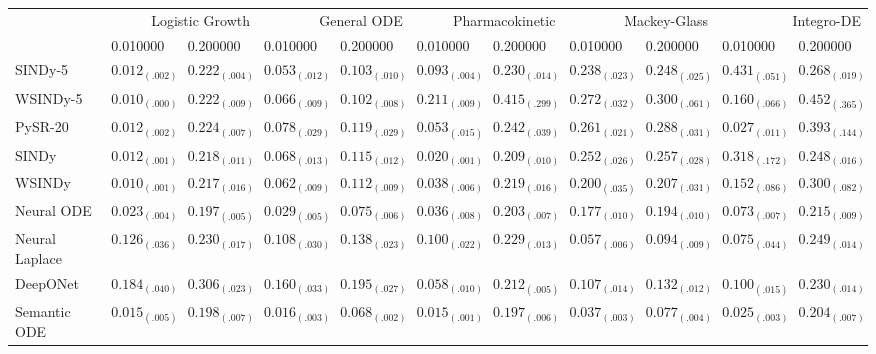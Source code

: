 \begin{tabular}{lllllllllll}
\toprule
 & \multicolumn{2}{r}{Logistic Growth} & \multicolumn{2}{r}{General ODE} & \multicolumn{2}{r}{Pharmacokinetic} & \multicolumn{2}{r}{Mackey-Glass} & \multicolumn{2}{r}{Integro-DE} \\
 & 0.010000 & 0.200000 & 0.010000 & 0.200000 & 0.010000 & 0.200000 & 0.010000 & 0.200000 & 0.010000 & 0.200000 \\
\midrule
SINDy-5 & $0.012_{(.002)}$ & $0.222_{(.004)}$ & $0.053_{(.012)}$ & $0.103_{(.010)}$ & $0.093_{(.004)}$ & $0.230_{(.014)}$ & $0.238_{(.023)}$ & $0.248_{(.025)}$ & $0.431_{(.051)}$ & $0.268_{(.019)}$ \\
WSINDy-5 & $0.010_{(.000)}$ & $0.222_{(.009)}$ & $0.066_{(.009)}$ & $0.102_{(.008)}$ & $0.211_{(.009)}$ & $0.415_{(.299)}$ & $0.272_{(.032)}$ & $0.300_{(.061)}$ & $0.160_{(.066)}$ & $0.452_{(.365)}$ \\
PySR-20 & $0.012_{(.002)}$ & $0.224_{(.007)}$ & $0.078_{(.029)}$ & $0.119_{(.029)}$ & $0.053_{(.015)}$ & $0.242_{(.039)}$ & $0.261_{(.021)}$ & $0.288_{(.031)}$ & $0.027_{(.011)}$ & $0.393_{(.144)}$ \\
SINDy & $0.012_{(.001)}$ & $0.218_{(.011)}$ & $0.068_{(.013)}$ & $0.115_{(.012)}$ & $0.020_{(.001)}$ & $0.209_{(.010)}$ & $0.252_{(.026)}$ & $0.257_{(.028)}$ & $0.318_{(.172)}$ & $0.248_{(.016)}$ \\
WSINDy & $0.010_{(.001)}$ & $0.217_{(.016)}$ & $0.062_{(.009)}$ & $0.112_{(.009)}$ & $0.038_{(.006)}$ & $0.219_{(.016)}$ & $0.200_{(.035)}$ & $0.207_{(.031)}$ & $0.152_{(.086)}$ & $0.300_{(.082)}$ \\
Neural ODE & $0.023_{(.004)}$ & $0.197_{(.005)}$ & $0.029_{(.005)}$ & $0.075_{(.006)}$ & $0.036_{(.008)}$ & $0.203_{(.007)}$ & $0.177_{(.010)}$ & $0.194_{(.010)}$ & $0.073_{(.007)}$ & $0.215_{(.009)}$ \\
Neural Laplace & $0.126_{(.036)}$ & $0.230_{(.017)}$ & $0.108_{(.030)}$ & $0.138_{(.023)}$ & $0.100_{(.022)}$ & $0.229_{(.013)}$ & $0.057_{(.006)}$ & $0.094_{(.009)}$ & $0.075_{(.044)}$ & $0.249_{(.014)}$ \\
DeepONet & $0.184_{(.040)}$ & $0.306_{(.023)}$ & $0.160_{(.033)}$ & $0.195_{(.027)}$ & $0.058_{(.010)}$ & $0.212_{(.005)}$ & $0.107_{(.014)}$ & $0.132_{(.012)}$ & $0.100_{(.015)}$ & $0.230_{(.014)}$ \\
Semantic ODE & $0.015_{(.005)}$ & $0.198_{(.007)}$ & $0.016_{(.003)}$ & $0.068_{(.002)}$ & $0.015_{(.001)}$ & $0.197_{(.006)}$ & $0.037_{(.003)}$ & $0.077_{(.004)}$ & $0.025_{(.003)}$ & $0.204_{(.007)}$ \\
\bottomrule
\end{tabular}
